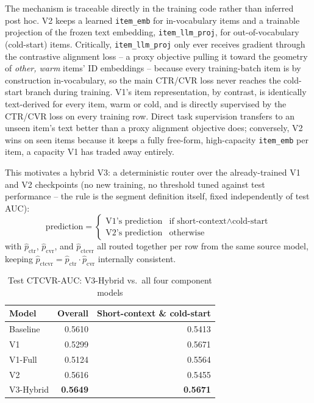 The mechanism is traceable directly in the training code rather than inferred post hoc. V2 keeps a learned \texttt{item\_emb} for in-vocabulary items and a trainable projection of the frozen text embedding, \texttt{item\_llm\_proj}, for out-of-vocabulary (cold-start) items. Critically, \texttt{item\_llm\_proj} only ever receives gradient through the contrastive alignment loss -- a proxy objective pulling it toward the geometry of \emph{other, warm} items' ID embeddings -- because every training-batch item is by construction in-vocabulary, so the main CTR/CVR loss never reaches the cold-start branch during training. V1's item representation, by contrast, is identically text-derived for every item, warm or cold, and is directly supervised by the CTR/CVR loss on every training row. Direct task supervision transfers to an unseen item's text better than a proxy alignment objective does; conversely, V2 wins on seen items because it keeps a fully free-form, high-capacity \texttt{item\_emb} per item, a capacity V1 has traded away entirely.

This motivates a hybrid V3: a deterministic router over the already-trained V1 and V2 checkpoints (no new training, no threshold tuned against test performance -- the rule is the segment definition itself, fixed independently of test AUC):
\[
\text{prediction} =
\begin{cases}
  \text{V1's prediction} & \text{if short-context} \wedge \text{cold-start} \\
  \text{V2's prediction} & \text{otherwise}
\end{cases}
\]
with $\hat{p}_{\text{ctr}}$, $\hat{p}_{\text{cvr}}$, and $\hat{p}_{\text{ctcvr}}$ all routed together per row from the same source model, keeping $\hat{p}_{\text{ctcvr}} = \hat{p}_{\text{ctr}} \cdot \hat{p}_{\text{cvr}}$ internally consistent.

\begin{table}[h]
\centering
\caption{Test CTCVR-AUC: V3-Hybrid vs.\ all four component models}
\label{tab:v3-results}
\begin{tabular}{lrr}
\toprule
Model & Overall & Short-context \& cold-start \\
\midrule
Baseline    & 0.5610 & 0.5413 \\
V1          & 0.5299 & 0.5671 \\
V1-Full     & 0.5124 & 0.5564 \\
V2          & 0.5616 & 0.5455 \\
V3-Hybrid   & \textbf{0.5649} & \textbf{0.5671} \\
\bottomrule
\end{tabular}
\end{table}

